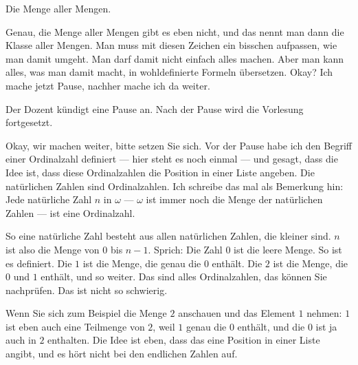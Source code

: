 \begin{student-interaction}[Studentenantwort]
Die Menge aller Mengen.
\end{student-interaction}

\begin{spoken-clean}[continued]
Genau, die Menge aller Mengen gibt es eben nicht, und das nennt man dann die Klasse aller Mengen. Man muss mit diesen Zeichen ein bisschen aufpassen, wie man damit umgeht. Man darf damit nicht einfach alles machen. Aber man kann alles, was man damit macht, in wohldefinierte Formeln übersetzen. Okay? Ich mache jetzt Pause, nachher mache ich da weiter.
\end{spoken-clean}

\begin{math-stroke}
\end{math-stroke}

\begin{meta-note}[Pause]
Der Dozent kündigt eine Pause an. Nach der Pause wird die Vorlesung fortgesetzt.
\end{meta-note}

\begin{spoken-clean}[00:31:29 - 00:33:09]
Okay, wir machen weiter, bitte setzen Sie sich. Vor der Pause habe ich den Begriff einer Ordinalzahl definiert --- hier steht es noch einmal --- und gesagt, dass die Idee ist, dass diese Ordinalzahlen die Position in einer Liste angeben. Die natürlichen Zahlen sind Ordinalzahlen. Ich schreibe das mal als Bemerkung hin: Jede natürliche Zahl $n$ in $\omega$ --- $\omega$ ist immer noch die Menge der natürlichen Zahlen --- ist eine Ordinalzahl.

So eine natürliche Zahl besteht aus allen natürlichen Zahlen, die kleiner sind. $n$ ist also die Menge von $0$ bis $n-1$. Sprich: Die Zahl $0$ ist die leere Menge. So ist es definiert. Die $1$ ist die Menge, die genau die $0$ enthält. Die $2$ ist die Menge, die $0$ und $1$ enthält, und so weiter. Das sind alles Ordinalzahlen, das können Sie nachprüfen. Das ist nicht so schwierig.

Wenn Sie sich zum Beispiel die Menge $2$ anschauen und das Element $1$ nehmen: $1$ ist eben auch eine Teilmenge von $2$, weil $1$ genau die $0$ enthält, und die $0$ ist ja auch in $2$ enthalten. Die Idee ist eben, dass das eine Position in einer Liste angibt, und es hört nicht bei den endlichen Zahlen auf.
\end{spoken-clean}

